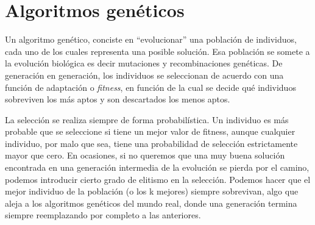 \section{Algoritmos genéticos}

Un algoritmo genético, conciste en  ``evolucionar'' una población de individuos, cada uno de los cuales representa una posible solución. Esa población se somete a la evolución biológica es decir mutaciones y recombinaciones genéticas. De generación en generación, los individuos se seleccionan de acuerdo con una función de adaptación o \emph{fitness}, en función de la cual se decide qué individuos sobreviven los más aptos y son descartados los menos aptos.

La selección se realiza siempre de forma probabilística. Un individuo es más probable que se seleccione si tiene un mejor valor de fitness, aunque cualquier individuo, por malo que sea, tiene una probabilidad de selección estrictamente mayor que cero. En ocasiones, si no queremos que una muy buena solución encontrada en una generación intermedia
de la evolución se pierda por el camino, podemos introducir cierto grado de elitismo en la selección. Podemos hacer que el mejor individuo de la población (o los k mejores) siempre sobrevivan, algo que aleja a los algoritmos genéticos del mundo real, donde una generación termina siempre reemplazando por completo a las anteriores.
